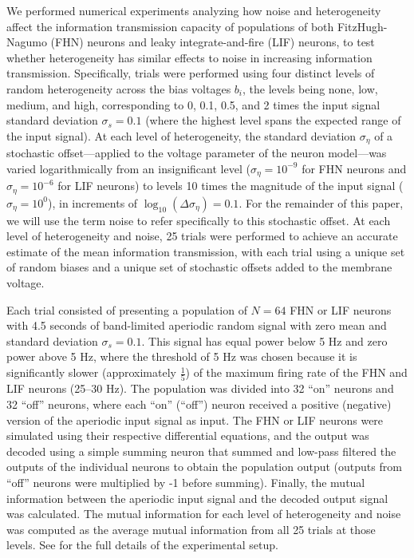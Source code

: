 \documentclass[12pt]{article}
\newcommand{\scn}[1]{\textsc{\nameref{scn:#1}}}
\begin{document}
We performed numerical experiments analyzing how noise and heterogeneity affect the information transmission capacity of populations of both FitzHugh-Nagumo (FHN) neurons and leaky integrate-and-fire (LIF) neurons, to test whether heterogeneity has similar effects to noise in increasing information transmission. Specifically, trials were performed using four distinct levels of random heterogeneity across the bias voltages $b_i$, the levels being none, low, medium, and high, corresponding to 0, 0.1, 0.5, and 2 times the input signal standard deviation $\sigma_s = 0.1$ (where the highest level spans the expected range of the input signal). At each level of heterogeneity, the standard deviation $\sigma_\eta$ of a stochastic offset---applied to the voltage parameter of the neuron model---was varied logarithmically from an insignificant level ($\sigma_\eta = 10^{-9}$ for FHN neurons and $\sigma_\eta = 10^{-6}$ for LIF neurons) to levels 10 times the magnitude of the input signal ($\sigma_\eta = 10^0$), in increments of $\log_{10}(\Delta\sigma_\eta) = 0.1$. For the remainder of this paper, we will use the term noise to refer specifically to this stochastic offset. At each level of heterogeneity and noise, 25 trials were performed to achieve an accurate estimate of the mean information transmission, with each trial using a unique set of random biases and a unique set of stochastic offsets added to the membrane voltage.

Each trial consisted of presenting a population of $N = 64$ FHN or LIF neurons with 4.5 seconds of band-limited aperiodic random signal with zero mean and standard deviation $\sigma_s = 0.1$. This signal has equal power below 5 Hz and zero power above 5 Hz, where the threshold of 5 Hz was chosen because it is significantly slower (approximately $\frac{1}{5}$) of the maximum firing rate of the FHN and LIF neurons (25--30 Hz). The population was divided into 32 ``on'' neurons and 32 ``off'' neurons, where each ``on'' (``off'') neuron received a positive (negative) version of the aperiodic input signal as input. The FHN or LIF neurons were simulated using their respective differential equations, and the output was decoded using a simple summing neuron that summed and low-pass filtered the outputs of the individual neurons to obtain the population output (outputs from ``off'' neurons were multiplied by -1 before summing). Finally, the mutual information between the aperiodic input signal and the decoded output signal was calculated. The mutual information for each level of heterogeneity and noise was computed as the average mutual information from all 25 trials at those levels. See \scn{methods} for the full details of the experimental setup.
\end{document}
